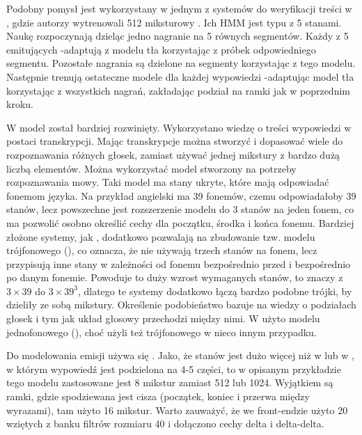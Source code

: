 Podobny pomysł jest wykorzystany w jednym z systemów do weryfikacji treści w \cite{utteranceVerificationFor}, gdzie
autorzy wytrenowali 512 miksturowy . Ich HMM jest typu  z 5 stanami.
Naukę rozpoczynają dzieląc jedno nagranie na 5 równych segmentów.
Każdy z 5  emitujących -adaptują z modelu tła korzystając z próbek odpowiedniego segmentu.
Pozostałe nagrania są dzielone na segmenty korzystając z tego modelu. Następnie trenują ostateczne modele dla każdej
wypowiedzi -adaptując model tła korzystając z wszystkich nagrań, zakładając podział na ramki jak
w poprzednim kroku.

W \cite{comparisonOfMultiple}
model  został bardziej rozwinięty. Wykorzystano wiedzę o treści wypowiedzi w postaci transkrypcji.
Mając transkrypcje można stworzyć i dopasować wiele  do rozpoznawania różnych głosek, zamiast
używać jednej mikstury z bardzo dużą liczbą elementów. Można wykorzystać model stworzony na potrzeby rozpoznawania mowy.
Taki model ma stany ukryte, które mają odpowiadać fonemom języka. Na przykład angielski ma 39
fonemów, czemu odpowiadałoby 39 stanów, lecz powszechne jest rozszerzenie
modelu do 3 stanów na jeden fonem, co ma pozwolić osobno określić cechy dla początku, środka i końca fonemu.
Bardziej złożone systemy, jak \cite{theHtkBook}
, dodatkowo pozwalają na zbudowanie tzw. modelu trójfonowego (), co oznacza,
że nie używają trzech stanów na fonem, lecz
przypisują inne stany w zależności od fonemu bezpośrednio przed i bezpośrednio po danym fonemie.
Powoduje to duży wzrost wymaganych stanów, to znaczy z $3 \times 39$ do $3 \times 39^3$,
dlatego te systemy dodatkowo łączą bardzo podobne trójki, by dzieliły ze sobą mikstury.
Określenie podobieństwo bazuje na wiedzy o podziałach głosek i tym jak układ głosowy przechodzi między nimi.
W \cite{comparisonOfMultiple}
użyto modelu jednofonowego (), choć użyli też trójfonowego w nieco innym przypadku.

Do modelowania emisji używa się . Jako, że stanów jest dużo więcej niż w 
lub w , w którym wypowiedź jest podzielona na 4-5 części, to
w opisanym przykładzie tego modelu zastosowane jest 8 mikstur zamiast 512 lub 1024. Wyjątkiem są ramki,
gdzie spodziewana jest cisza (początek, koniec i przerwa między wyrazami), tam
użyto 16 mikstur. Warto zauważyć, że we front-endzie użyto 20  wziętych z banku filtrów rozmiaru
40 i dołączono cechy delta i delta-delta.

